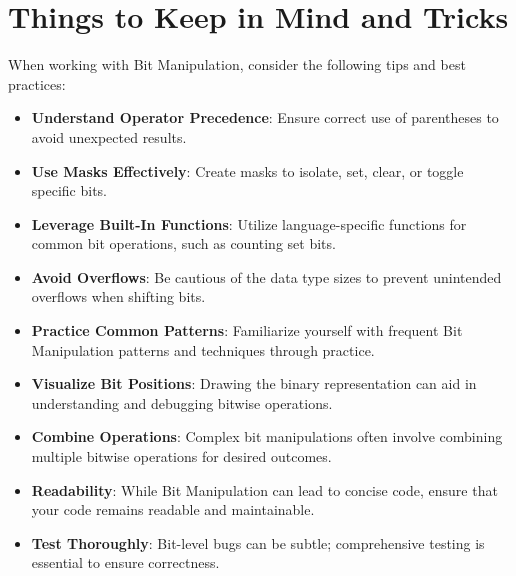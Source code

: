 \section*{Things to Keep in Mind and Tricks}

When working with Bit Manipulation, consider the following tips and best practices:

\begin{itemize}
    \item \textbf{Understand Operator Precedence}: Ensure correct use of parentheses to avoid unexpected results.
    
    \item \textbf{Use Masks Effectively}: Create masks to isolate, set, clear, or toggle specific bits.
    
    \item \textbf{Leverage Built-In Functions}: Utilize language-specific functions for common bit operations, such as counting set bits.
    
    \item \textbf{Avoid Overflows}: Be cautious of the data type sizes to prevent unintended overflows when shifting bits.
    
    \item \textbf{Practice Common Patterns}: Familiarize yourself with frequent Bit Manipulation patterns and techniques through practice.
    
    \item \textbf{Visualize Bit Positions}: Drawing the binary representation can aid in understanding and debugging bitwise operations.
    
    \item \textbf{Combine Operations}: Complex bit manipulations often involve combining multiple bitwise operations for desired outcomes.
    
    \item \textbf{Readability}: While Bit Manipulation can lead to concise code, ensure that your code remains readable and maintainable.
    
    \item \textbf{Test Thoroughly}: Bit-level bugs can be subtle; comprehensive testing is essential to ensure correctness.
\end{itemize}

